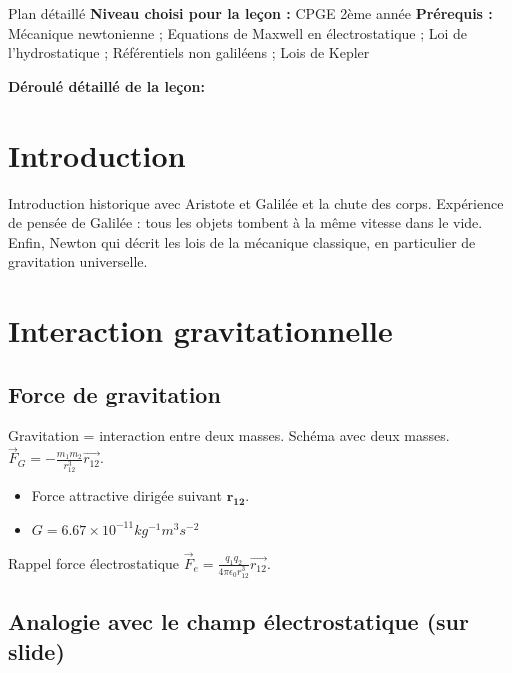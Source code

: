 \begin{reportBlock}{Plan détaillé}
  \textbf{Niveau choisi pour la leçon :} CPGE 2ème année
  \newline
  \textbf{Prérequis : }Mécanique newtonienne ; Equations de Maxwell en électrostatique ; Loi de l'hydrostatique ; Référentiels non galiléens ; Lois de Kepler
  \newline
  
  \textbf{Déroulé détaillé de la leçon: }   \newline
  
  \section*{Introduction}

Introduction historique avec Aristote et Galilée et la chute des corps. Expérience de pensée de Galilée : tous les objets tombent à la même vitesse dans le vide. Enfin, Newton qui décrit les lois de la mécanique classique, en particulier de gravitation universelle.


\section{Interaction gravitationnelle}

\subsection{Force de gravitation}

Gravitation = interaction entre deux masses. Schéma avec deux masses. $\overrightarrow{F}_G = - \frac{m_1 m_2}{r_{12}^3} \overrightarrow{r_{12}}$. \\
\begin{itemize}
\item Force attractive dirigée suivant $\mathbf{r_{12}}$.
\item $G = 6.67\times10^{-11} kg^{-1} m^3 s^{-2}$
\end{itemize}

Rappel force électrostatique $\overrightarrow{F}_e = \frac{q_1 q_2}{4\pi \epsilon_0 r_{12}^3} \overrightarrow{r_{12}}$.


\subsection{Analogie avec le champ électrostatique (sur slide)}


\end{reportBlock}
